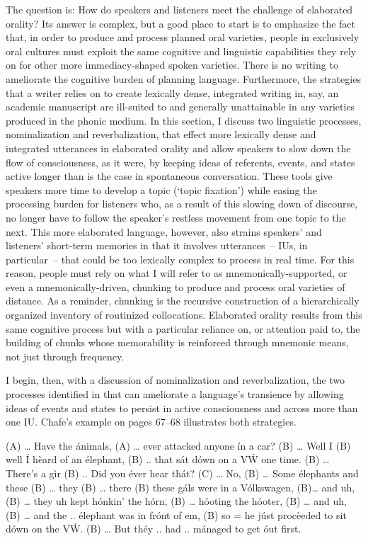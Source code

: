   The question is: How do speakers and listeners meet the challenge of elaborated orality? Its answer is complex, but a good place to start is to emphasize the fact that, in order to produce and process planned oral varieties, people in exclusively oral cultures must exploit the same cognitive and linguistic capabilities they rely on for other more immediacy-shaped spoken varieties. There is no writing to ameliorate the cognitive burden of planning language. Furthermore, the strategies that a writer relies on to create lexically dense, integrated writing in, say, an academic manuscript are ill-suited to and generally unattainable in any varieties produced in the phonic medium. In this section, I discuss two linguistic processes, nominalization and reverbalization, that effect more lexically dense and integrated utterances in elaborated orality and allow speakers to slow down the flow of consciousness, as it were, by keeping ideas of referents, events, and states active longer than is the case in spontaneous conversation. These tools give speakers more time to develop a topic (‘topic fixation’) while easing the processing burden for listeners who, as a result of this slowing down of discourse, no longer have to follow the speaker’s restless movement from one topic to the next. This more elaborated language, however, also strains speakers’ and listeners’ short-term memories in that it involves utterances~-- IUs, in particular~-- that could be too lexically complex to process in real time. For this reason, people must rely on what I will refer to as mnemonically-supported, or even a mnemonically-driven, chunking to produce and process oral varieties of distance. As a reminder, chunking is the recursive construction of a hierarchically organized inventory of routinized collocations. Elaborated orality results from this same cognitive process but with a particular reliance on, or attention paid to, the building of chunks whose memorability is reinforced through mnemonic means, not just through frequency.

I begin, then, with a discussion of nominalization and reverbalization, the two processes identified in \citet[68]{Chafe1994} that can ameliorate a language’s transience by allowing ideas of events and states to persist in active consciousness and across more than one IU. Chafe’s example on pages 67--68 illustrates both strategies.

\ea%
    \label{ex:6:4}
\ea(A)  … Have the ánimals,
\ex(A) … ever attacked anyone ín a car?
\ex(B)  … Well I
\ex(B)  well Í hèard of an élephant,
\ex(B)  .. that sát dówn on a {\textasciigrave}VẂ one time.
\ex(B)  … There’s a gìr
\ex(B)  .. Did you éver hear thát?
\ex(C)  … No,
\ex(B)  … Some élephants and these
\ex(B)  … they
\ex(B)  … there
\ex(B)  these gáls were in a Vólkswagen,
\ex(B)… and uh,
\ex(B)  … they uh kept hónkin’ the hórn,
\ex(B)  … hóoting the hóoter,
\ex(B) … and uh,
\ex(B)  … and the .. élephant was in frónt of em,
\ex(B)  so = he júst procèeded to sit dówn on the {\textasciigrave}VẂ.
\ex(B)  … But théy .. had .. mánaged to get óut first.
\z
\z

